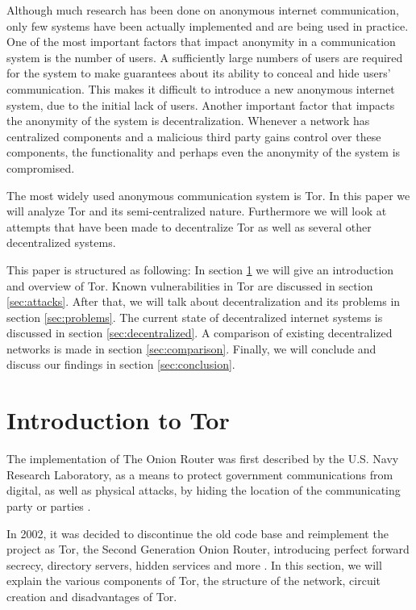 \documentclass{article}
\begin{document}
	Although much research has been done on anonymous internet communication, only few systems have been actually implemented and are being used in practice. One of the most important factors that impact anonymity in a communication system is the number of users. A sufficiently large numbers of users are required for the system to make guarantees about its ability to conceal and hide users' communication. This makes it difficult to introduce a new anonymous internet system, due to the initial lack of users. Another important factor that impacts the anonymity of the system is decentralization. Whenever a network has centralized components and a malicious third party gains control over these components, the functionality and perhaps even the anonymity of the system is compromised.
	
	The most widely used anonymous communication system is Tor. In this paper we will analyze Tor and its semi-centralized nature. Furthermore we will look at attempts that have been made to decentralize Tor as well as several other decentralized systems.
	
	This paper is structured as following: In section \ref{sec:tor} we will give an introduction and overview of Tor. Known vulnerabilities in Tor are discussed in section \ref{sec:attacks}. After that, we will talk about decentralization and its problems in section \ref{sec:problems}. The current state of decentralized internet systems is discussed in section \ref{sec:decentralized}. A comparison of existing decentralized networks is made in section \ref{sec:comparison}. Finally, we will conclude and discuss our findings in section \ref{sec:conclusion}.
	
\section{Introduction to Tor}
	\label{sec:tor}
	
	The implementation of The Onion Router was first described by the U.S. Navy Research Laboratory, as a means to protect government communications from digital, as well as physical attacks, by hiding the location of the communicating party or parties \cite{goldschlag1996hiding}.
	
	In 2002, it was decided to discontinue the old code base and reimplement the project as Tor, the Second Generation Onion Router, introducing perfect forward secrecy, directory servers, hidden services and more \cite{dingledine2004tor}. In this section, we will explain the various components of Tor, the structure of the network, circuit creation and disadvantages of Tor.
	
\end{document}

